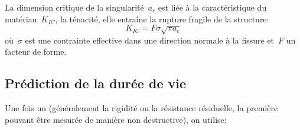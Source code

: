 La dimension critique de la singularité~$a_c$ est liée à la caractéristique du matériau~$K_{IC}$, la ténacité, elle entraîne la rupture fragile de la structure: 
\begin{equation} K_{IC} = F \sigma \sqrt{\pi a_c} \end{equation}
où~$\sigma$ est une contrainte effective dans une direction normale à la fissure et~$F$ un facteur de forme.




\medskip
\subsection{Prédiction de la durée de vie}

Une fois un  (généralement la rigidité ou la résistance résiduelle, la première pouvant être mesurée de manière non destructive), on utilise:
